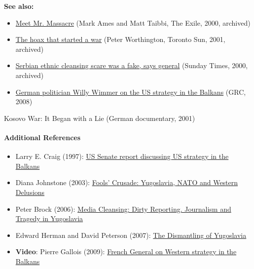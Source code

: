 \textbf{See also:}

\begin{itemize}
\tightlist
\item
  \href{https://swprs.files.wordpress.com/2019/12/meet-mister-massacre_ames-taibbi_the-exile_2000.pdf}{Meet
  Mr. Massacre} (Mark Ames and Matt Taibbi, The Exile, 2000, archived)
\item
  \href{https://swprs.files.wordpress.com/2019/12/racak-massacre_peter-worthington_toronto-sun_2001.pdf}{The
  hoax that started a war} (Peter Worthington, Toronto Sun, 2001,
  archived)
\item
  \href{https://swprs.files.wordpress.com/2019/12/kosovo_operation-horseshoe-fake_sunday-times_2000.pdf}{Serbian
  ethnic cleansing scare was a fake, says general} (Sunday Times, 2000,
  archived)
\item
  \href{https://www.globalresearch.ca/correspondence-between-german-politicians-reveals-the-hidden-agenda-behind-kosovo-s-independence/8304}{German
  politician Willy Wimmer on the US strategy in the Balkans} (GRC, 2008)
\end{itemize}

Kosovo War: It Began with a Lie (German documentary, 2001)

\hypertarget{additional-references}{%
\paragraph{Additional References}\label{additional-references}}

\begin{itemize}
\tightlist
\item
  Larry E. Craig (1997):
  \href{https://web.archive.org/web/20110206110107/http://rpc.senate.gov/releases/1997/iran.htm}{US
  Senate report discussing US strategy in the Balkans}
\item
  Diana Johnstone (2003):
  \href{https://www.amazon.com/Fools-Crusade-Yugoslavia-Delusions-Illusions/dp/0745319505}{Fools'
  Crusade: Yugoslavia, NATO and Western Delusions}
\item
  Peter Brock (2006):
  \href{https://www.amazon.com/Media-Cleansing-Reporting-Peter-Brock-ebook-dp-B005VGNROO/dp/B005VGNROO}{Media
  Cleansing: Dirty Reporting. Journalism and Tragedy in Yugoslavia}
\item
  Edward Herman and David Peterson (2007):
  \href{https://monthlyreview.org/2007/10/01/the-dismantling-of-yugoslavia/}{The
  Dismantling of Yugoslavia}
\item
  \textbf{Video}: Pierre Gallois (2009):
  \href{https://archive.org/details/french-general-pierre-marie-gallois-on-yugoslavia-war-2009}{French
  General on Western strategy in the Balkans}
\end{itemize}

